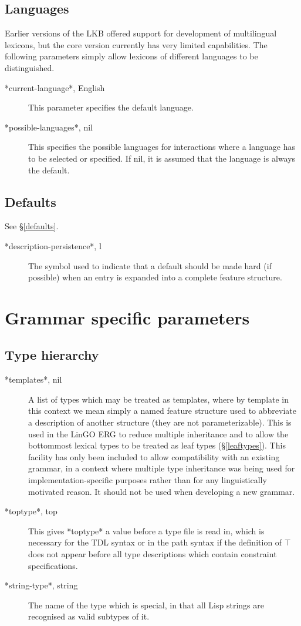 \documentclass[12pt]{report}
\begin{document}
\subsection{Languages}
\label{langglob}
Earlier versions of the LKB offered support for development of
multilingual lexicons, but the core version currently
has very limited capabilities.  The following
parameters simply allow lexicons of different languages to be distinguished.
\begin{description}
\item[*current-language*, English]
This parameter specifies the default language.
\item[*possible-languages*, nil]
This specifies the possible languages for interactions
where a language has to be selected or specified.  If nil,
it is assumed that the language is always the default.
\end{description}

\subsection{Defaults}
\label{defglob}
See \S\ref{defaults}.
\begin{description}
\item[ *description-persistence*, l]
The symbol used to indicate that a default should be
made hard (if possible) when an entry is expanded into a complete
feature structure.
\end{description}

\section{Grammar specific parameters}
\label{gramglob}
\subsection{Type hierarchy}
\label{thierglob}
\begin{description}
\item [*templates*, nil] A list of types which may be treated as 
templates, where by template in this context we mean simply a named
feature structure used to abbreviate a description of another structure
(they are not parameterizable).
This is used in the LinGO ERG to reduce multiple inheritance
and to allow the bottommost lexical types to be treated as leaf types
(\S\ref{leaftypes}).  This facility has only been included to allow
compatibility with an existing grammar, in a context where
multiple type inheritance was being used for implementation-specific 
purposes rather than for any linguistically motivated reason.
It should not be used when developing a new grammar.
\item [*toptype*, top] This gives *toptype* a value before a type file
is read in, which is necessary for the TDL syntax or in the path syntax
if the definition of $\top$ does not
appear before all type descriptions which contain constraint specifications.
\item [*string-type*, string] The name of the type which is special, in that
all Lisp strings are recognised as valid subtypes of it.
\end{description}
\end{document}
